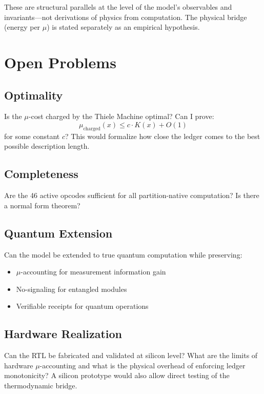 These are structural parallels at the level of the model's observables and invariants---not derivations of physics from computation. The physical bridge (energy per $\mu$) is stated separately as an empirical hypothesis.

\section{Open Problems}

\subsection{Optimality}

Is the $\mu$-cost charged by the Thiele Machine optimal? Can I prove:
\begin{equation}
    \mu_{\text{charged}}(x) \le c \cdot K(x) + O(1)
\end{equation}
for some constant $c$? This would formalize how close the ledger comes to the best possible description length.

\subsection{Completeness}

Are the 46 active opcodes sufficient for all partition-native computation? Is there a normal form theorem?

\subsection{Quantum Extension}

Can the model be extended to true quantum computation while preserving:
\begin{itemize}
    \item $\mu$-accounting for measurement information gain
    \item No-signaling for entangled modules
    \item Verifiable receipts for quantum operations
\end{itemize}

\subsection{Hardware Realization}

Can the RTL be fabricated and validated at silicon level? What are the limits of hardware $\mu$-accounting and what is the physical overhead of enforcing ledger monotonicity? A silicon prototype would also allow direct testing of the thermodynamic bridge.

